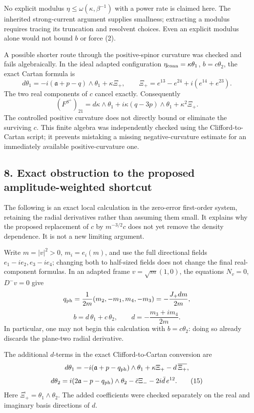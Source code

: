 \documentclass[
]{article}
\begin{document}
No explicit modulus \(\eta\le\omega(\kappa,\beta^{-1})\) with a power
rate is claimed here. The inherited strong-current argument supplies
smallness; extracting a modulus requires tracing its truncation and
resolvent choices. Even an explicit modulus alone would not bound \(b\)
or force (2).

A possible shorter route through the positive-spinor curvature was
checked and fails algebraically. In the ideal adapted configuration
\(\eta_{\rm conn}=\kappa\theta_1\), \(b=c\theta_2\), the exact Cartan
formula is \[
 d\theta_1=-i(\mathfrak a+p-q)\wedge\theta_1+\kappa\Xi_+,
 \qquad \Xi_+=e^{13}-e^{24}+i(e^{14}+e^{23}).
\] The two real components of \(c\) cancel exactly. Consequently \[
 (F^{S^+})_{21}
 =d\kappa\wedge\theta_1+i\kappa(q-3p)\wedge\theta_1+\kappa^2\Xi_+.
\] The controlled positive curvature does not directly bound or
eliminate the surviving \(c\). This finite algebra was independently
checked using the Clifford-to-Cartan script; it prevents mistaking a
missing negative-curvature estimate for an immediately available
positive-curvature one.

\hypertarget{exact-obstruction-to-the-proposed-amplitude-weighted-shortcut}{%
\subsection{8. Exact obstruction to the proposed amplitude-weighted
shortcut}\label{exact-obstruction-to-the-proposed-amplitude-weighted-shortcut}}

The following is an exact local calculation in the zero-error
first-order system, retaining the radial derivatives rather than
assuming them small. It explains why the proposed replacement of \(c\)
by \(m^{-3/2}c\) does not yet remove the density dependence. It is not a
new limiting argument.

Write \(m=|v|^2>0\), \(m_i=e_i(m)\), and use the full directional fields
\(e_1-ie_2,e_3-ie_4\); changing both to half-sized fields does not
change the final real-component formulas. In an adapted frame
\(v=\sqrt m(1,0)\), the equations \(N_v=0\), \(D^-v=0\) give \[
 q_{\rm ph}=\frac1{2m}(m_2,-m_1,m_4,-m_3)
 =-\frac{J_+dm}{2m},
\] \[
 \boxed{b=d\,\theta_1+c\,\theta_2,
 \qquad d=-\frac{m_3+i m_4}{2m}.} \tag{14}
\] In particular, one may not begin this calculation with
\(b=c\theta_2\): doing so already discards the plane-two radial
derivative.

The additional \(d\)-terms in the exact Clifford-to-Cartan conversion
are \[
 d\theta_1=-i(\mathfrak a+p-q_{\rm ph})\wedge\theta_1
             +\kappa\Xi_+-d\,\overline{\Xi_+},
\] \[
 d\theta_2=i(2\mathfrak a-p-q_{\rm ph})\wedge\theta_2
             -\bar c\Xi_- -2i\bar d\,e^{12}.
 \tag{15}
\] Here \(\overline{\Xi_+}=\theta_1\wedge\theta_2\). The added
coefficients were checked separately on the real and imaginary basis
directions of \(d\).
\end{document}
